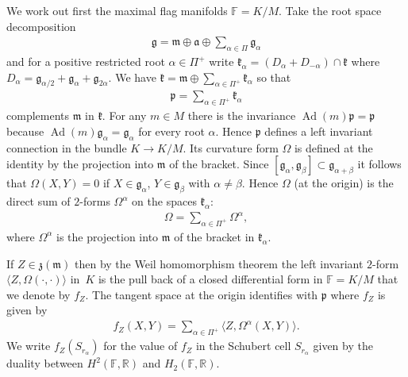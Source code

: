 \documentclass[10pt,a4paper]{amsart}
\numberwithin{equation}{section}
\begin{document}
We work out first the maximal flag manifolds $\mathbb{F}=K/M$. Take the root space decomposition
\begin{gather*}
\mathfrak{g}=\mathfrak{m}\oplus \mathfrak{a}\oplus \sum_{\alpha \in \Pi }\mathfrak{g}_{\alpha }
\end{gather*}
and for a positive restricted root $\alpha \in \Pi ^{+}$ write $\mathfrak{k}_{\alpha }= ( D_{\alpha }+D_{-\alpha } ) \cap \mathfrak{k}$ where $D_{\alpha }=\mathfrak{g}_{\alpha /2}+\mathfrak{g}_{\alpha }+\mathfrak{g}_{2\alpha }$. We have $\mathfrak{k}=\mathfrak{m}\oplus \sum\limits_{\alpha \in \Pi ^{+}}\mathfrak{k}_{\alpha }$ so that
\begin{gather*}
\mathfrak{p}=\sum_{\alpha \in \Pi ^{+}}\mathfrak{k}_{\alpha }
\end{gather*}
complements $\mathfrak{m}$ in $\mathfrak{k}$. For any $m\in M$ there is the invariance $\operatorname{Ad}(m) \mathfrak{p}=\mathfrak{p}$ because $\operatorname{Ad}(m) \mathfrak{g}_{\alpha }=\mathfrak{g}_{\alpha }$ for every root $\alpha $. Hence $\mathfrak{p}$ defines a left invariant connection in the bundle $K\rightarrow K/M$. Its curvature form $\Omega $ is defined at the identity by the projection into $\mathfrak{m}$ of the bracket. Since $[\mathfrak{g}_{\alpha },\mathfrak{g}_{\beta }]\subset \mathfrak{g}_{\alpha +\beta }$ it follows that $\Omega ( X,Y) =0$ if $X\in \mathfrak{g}_{\alpha }$, $Y\in \mathfrak{g}_{\beta }$ with $\alpha \neq \beta $. Hence $\Omega $ (at the origin) is the direct sum of $2$-forms $\Omega ^{\alpha }$ on the spaces $\mathfrak{k}_{\alpha }$:
\begin{gather*}
\Omega =\sum_{\alpha \in \Pi ^{+}}\Omega ^{\alpha },
\end{gather*}%
where $\Omega ^{\alpha }$ is the projection into $\mathfrak{m}$ of the bracket in $\mathfrak{k}_{\alpha }$.

If $Z\in \mathfrak{z}(\mathfrak{m}) $ then by the Weil homomorphism theorem the left invariant $2$-form $\langle Z,\Omega (\cdot,\cdot ) \rangle $ in~$K$ is the pull back of a closed differential form in $\mathbb{F}=K/M$ that we denote by $f_{Z}$. The tangent space at the origin identifies with $\mathfrak{p}$ where $f_{Z}$ is given by
\begin{gather*}
f_{Z}(X,Y) =\sum_{\alpha \in \Pi ^{+}}\langle Z,\Omega ^{\alpha}(X,Y) \rangle.
\end{gather*}%
We write $f_{Z} ( S_{r_{\alpha }} ) $ for the value of $f_{Z}$ in the Schubert cell $S_{r_{\alpha }}$ given by the duality between $H^{2}( \mathbb{F},\mathbb{R}) $ and $H_{2}( \mathbb{F},\mathbb{R}) $.
\end{document}

